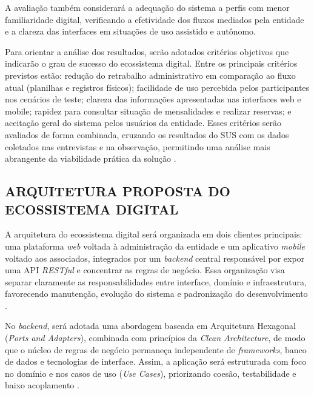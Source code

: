 ﻿\documentclass[12pt,a4paper]{article}
\begin{document}
A avaliação também considerará a adequação do sistema a perfis com menor familiaridade digital, verificando a efetividade dos fluxos mediados pela entidade e a clareza das interfaces em situações de uso assistido e autônomo.

Para orientar a análise dos resultados, serão adotados critérios objetivos que indicarão o grau de sucesso do ecossistema digital. Entre os principais critérios previstos estão: redução do retrabalho administrativo em comparação ao fluxo atual (planilhas e registros físicos); facilidade de uso percebida pelos participantes nos cenários de teste; clareza das informações apresentadas nas interfaces web e mobile; rapidez para consultar situação de mensalidades e realizar reservas; e aceitação geral do sistema pelos usuários da entidade. Esses critérios serão avaliados de forma combinada, cruzando os resultados do SUS com os dados coletados nas entrevistas e na observação, permitindo uma análise mais abrangente da viabilidade prática da solução \citep{brooke1996,creswell2014}.

\subsection{ARQUITETURA PROPOSTA DO ECOSSISTEMA DIGITAL}

A arquitetura do ecossistema digital será organizada em dois clientes principais: uma plataforma \textit{web} voltada à administração da entidade e um aplicativo \textit{mobile} voltado aos associados, integrados por um \textit{backend} central responsável por expor uma API \textit{RESTful} e concentrar as regras de negócio. Essa organização visa separar claramente as responsabilidades entre interface, domínio e infraestrutura, favorecendo manutenção, evolução do sistema e padronização do desenvolvimento \citep{fielding2000,martin2017}.

No \textit{backend}, será adotada uma abordagem baseada em Arquitetura Hexagonal (\textit{Ports and Adapters}), combinada com princípios da \textit{Clean Architecture}, de modo que o núcleo de regras de negócio permaneça independente de \textit{frameworks}, banco de dados e tecnologias de interface. Assim, a aplicação será estruturada com foco no domínio e nos casos de uso (\textit{Use Cases}), priorizando coesão, testabilidade e baixo acoplamento \citep{cockburn2005,martin2017}.
\end{document}
